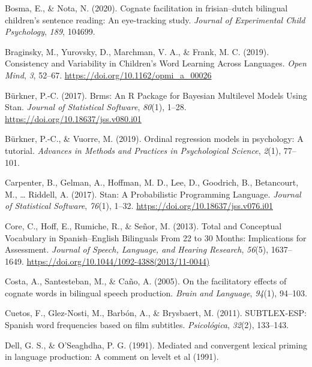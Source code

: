 \documentclass[
  english,
  man,man,floatsintext]{apa6}
\newlength{\cslhangindent}
\newenvironment{cslreferences}%
  {\setlength{\parindent}{0pt}%
  \everypar{\setlength{\hangindent}{\cslhangindent}}\ignorespaces}%
  {\par}
\begin{document}
\begin{cslreferences}
\leavevmode\hypertarget{ref-bosma2020cognate}{}%
Bosma, E., \& Nota, N. (2020). Cognate facilitation in frisian--dutch bilingual children's sentence reading: An eye-tracking study. \emph{Journal of Experimental Child Psychology}, \emph{189}, 104699.

\leavevmode\hypertarget{ref-braginsky_consistency_2019}{}%
Braginsky, M., Yurovsky, D., Marchman, V. A., \& Frank, M. C. (2019). Consistency and Variability in Children's Word Learning Across Languages. \emph{Open Mind}, \emph{3}, 52--67. \url{https://doi.org/10.1162/opmi_a_00026}

\leavevmode\hypertarget{ref-burkner_brms_2017}{}%
Bürkner, P.-C. (2017). Brms: An R Package for Bayesian Multilevel Models Using Stan. \emph{Journal of Statistical Software}, \emph{80}(1), 1--28. \url{https://doi.org/10.18637/jss.v080.i01}

\leavevmode\hypertarget{ref-burkner_ordinal_2019}{}%
Bürkner, P.-C., \& Vuorre, M. (2019). Ordinal regression models in psychology: A tutorial. \emph{Advances in Methods and Practices in Psychological Science}, \emph{2}(1), 77--101.

\leavevmode\hypertarget{ref-carpenter_stan_2017}{}%
Carpenter, B., Gelman, A., Hoffman, M. D., Lee, D., Goodrich, B., Betancourt, M., \ldots{} Riddell, A. (2017). Stan: A Probabilistic Programming Language. \emph{Journal of Statistical Software}, \emph{76}(1), 1--32. \url{https://doi.org/10.18637/jss.v076.i01}

\leavevmode\hypertarget{ref-core_total_2013}{}%
Core, C., Hoff, E., Rumiche, R., \& Señor, M. (2013). Total and Conceptual Vocabulary in Spanish--English Bilinguals From 22 to 30 Months: Implications for Assessment. \emph{Journal of Speech, Language, and Hearing Research}, \emph{56}(5), 1637--1649. \url{https://doi.org/10.1044/1092-4388(2013/11-0044)}

\leavevmode\hypertarget{ref-costa2005facilitatory}{}%
Costa, A., Santesteban, M., \& Caño, A. (2005). On the facilitatory effects of cognate words in bilingual speech production. \emph{Brain and Language}, \emph{94}(1), 94--103.

\leavevmode\hypertarget{ref-cuetos_subtlex-esp_2011}{}%
Cuetos, F., Glez-Nosti, M., Barbón, A., \& Brysbaert, M. (2011). SUBTLEX-ESP: Spanish word frequencies based on film subtitles. \emph{Psicológica}, \emph{32}(2), 133--143.

\leavevmode\hypertarget{ref-dell1991mediated}{}%
Dell, G. S., \& O'Seaghdha, P. G. (1991). Mediated and convergent lexical priming in language production: A comment on levelt et al (1991).


\end{cslreferences}
\end{document}
